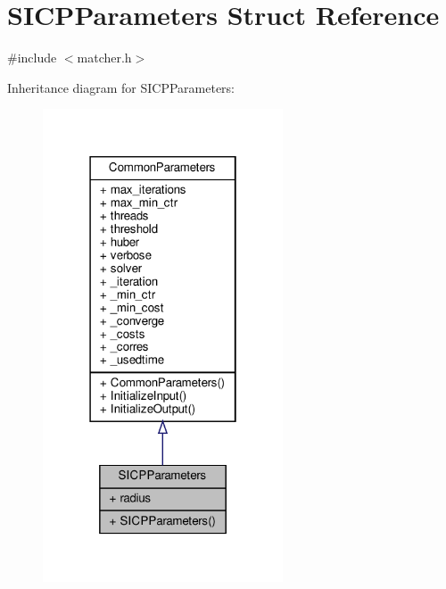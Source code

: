 \hypertarget{structSICPParameters}{}\section{S\+I\+C\+P\+Parameters Struct Reference}
\label{structSICPParameters}


{\ttfamily \#include $<$matcher.\+h$>$}



Inheritance diagram for S\+I\+C\+P\+Parameters\+:\nopagebreak
\begin{figure}[H]
\begin{center}
\leavevmode
\includegraphics[width=202pt]{d9/d74/structSICPParameters__inherit__graph}
\end{center}
\end{figure}


